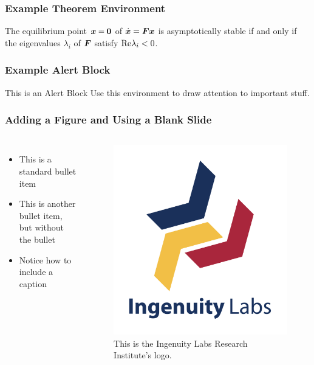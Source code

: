 \documentclass[fleqn]{ingenuitylabs-slides}
\begin{document}

\SlideWhite
\begin{frame}[fragile]
    \frametitle{Example Theorem Environment}
    \begin{thm}
        The equilibrium point $\bm{x}=\bm{0}$ of $\dot{\bm{x}}=\bm{Fx}$ is asymptotically stable if and only if the eigenvalues $\lambda_{i}$ of $\bm{F}$ satisfy $\textup{Re}\lambda_{i}<0$.
    \end{thm}
\end{frame}


\SlideWhite
\begin{frame}[fragile]
    \frametitle{Example Alert Block}
    \begin{alertblock}{This is an Alert Block}
        Use this environment to draw attention to important stuff.
    \end{alertblock}
\end{frame}


\SlideWhite
\begin{frame}
    \frametitle{Adding a Figure and Using a Blank Slide}
    \begin{columns}
        \begin{itemize}
            \item This is a standard bullet item
            \item[] This is another bullet item, but without the bullet
            \item Notice how to include a caption
        \end{itemize}
        \begin{figure}
            \flushleft
            \includegraphics[width=0.6\columnwidth]{figs/ingenuitylabs-logo-colourful.pdf}
            \caption{This is the Ingenuity Labs Research Institute's logo.}
        \end{figure}
    \end{columns}
\end{frame}
\end{document}
